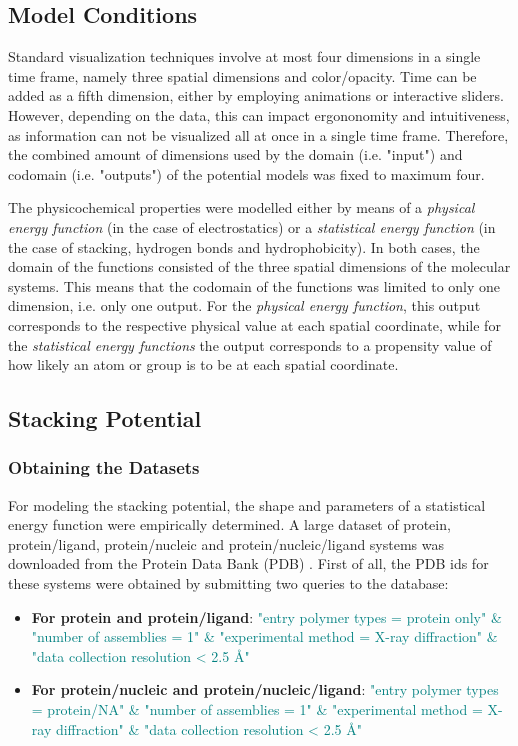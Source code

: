   \subsection{Model Conditions}
    Standard visualization techniques involve at most four dimensions in a single time frame, namely three spatial dimensions and color/opacity. Time can be added as a fifth dimension, either by employing animations or interactive sliders. However, depending on the data, this can impact ergononomity and intuitiveness, as information can not be visualized all at once in a single time frame. Therefore, the combined amount of dimensions used by the domain (i.e. "input") and codomain (i.e. "outputs") of the potential models was fixed to maximum four.

    The physicochemical properties were modelled either by means of a \textit{physical energy function} (in the case of electrostatics) or a \textit{statistical energy function} (in the case of stacking, hydrogen bonds and hydrophobicity). In both cases, the domain of the functions consisted of the three spatial dimensions of the molecular systems. This means that the codomain of the functions was limited to only one dimension, i.e. only one output. For the \textit{physical energy function}, this output corresponds to the respective physical value at each spatial coordinate, while for the \textit{statistical energy functions} the output corresponds to a propensity value of how likely an atom or group is to be at each spatial coordinate.

  \subsection{Stacking Potential}
    \subsubsection{Obtaining the Datasets}
      For modeling the stacking potential, the shape and parameters of a statistical energy function were empirically determined. A large dataset of protein, protein/ligand, protein/nucleic and protein/nucleic/ligand systems was downloaded from the Protein Data Bank (PDB) \cite{pdb_2003}. First of all, the PDB ids for these systems were obtained by submitting two queries to the database:

      \begin{itemize}
        \item \textbf{For protein and protein/ligand}: \textcolor{teal}{"entry polymer types = protein only" \& "number of assemblies = 1" \& "experimental method = X-ray diffraction" \& "data collection resolution < 2.5 \AA"}
        \item \textbf{For protein/nucleic and protein/nucleic/ligand}: \textcolor{teal}{"entry polymer types = protein/NA" \& "number of assemblies = 1" \& "experimental method = X-ray diffraction" \& "data collection resolution < 2.5 \AA"}
      \end{itemize}


